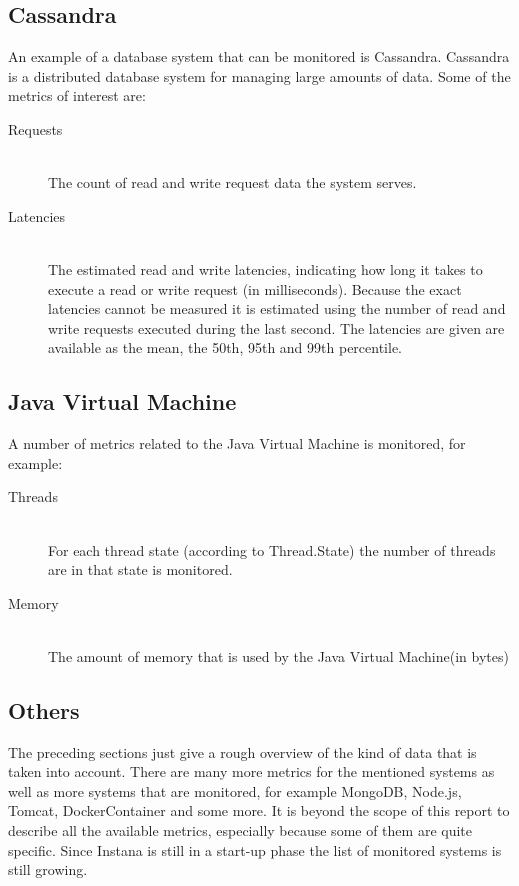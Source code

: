 \documentclass[]{article}
\begin{document}
\subsection{Cassandra}
An example of a database system that can be monitored is Cassandra. Cassandra is a distributed database system for managing large amounts of data. Some of the metrics of interest are:
\begin{description}
	\item[Requests] \hfill\\
	The count of read and write request data the system serves.
	
	\item[Latencies] \hfill\\
	The estimated read and write latencies, indicating how long it takes to execute a read or write request (in milliseconds). Because the exact latencies cannot be measured it is estimated using the number of read and write requests executed during the last second. The latencies are given are available as the mean, the 50th, 95th and 99th percentile.
\end{description}

\subsection{Java Virtual Machine}
A number of metrics related to the Java Virtual Machine is monitored, for example:
\begin{description}
	\item[Threads] \hfill\\
	For each thread state (according to Thread.State) the number of threads are in that state is monitored.
	\item[Memory] \hfill\\
	The amount of memory that is used by the Java Virtual Machine(in bytes)
\end{description}

\subsection{Others}
The preceding sections just give a rough overview of the kind of data that is taken into account.
There are many more metrics for the mentioned systems as well as more systems that are monitored, for example MongoDB, Node.js, Tomcat, DockerContainer and some more.
It is beyond the scope of this report to describe all the available metrics, especially because some of them are quite specific.
Since Instana is still in a start-up phase the list of monitored systems is still growing.
\end{document}
